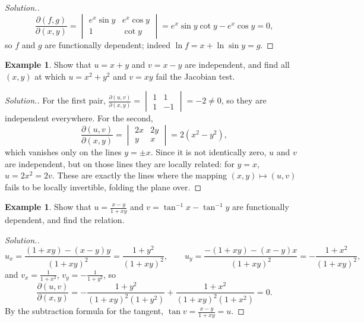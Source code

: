 \documentclass[11pt,a4paper]{article}
\theoremstyle{definition}
\newtheorem{exa}[thm]{Example}
\newenvironment{solution}
  {\renewcommand{\qedsymbol}{}\begin{proof}[\textit{Solution}.]}
  {\end{proof}}
\begin{document}
\begin{solution}
\[\frac{\partial (f,g)}{\partial (x,y)} = \begin{vmatrix}
e^x\sin y & e^x\cos y\\
1 & \cot y
\end{vmatrix} = e^x\sin y\cot y - e^x\cos y = 0 ,\]
so $f$ and $g$ are functionally dependent; indeed $\ln f = x + \ln\sin y = g$.
\end{solution}

\begin{exa}
\label{ex:independent}
Show that $u = x + y$ and $v = x - y$ are independent, and find all $(x,y)$ at
which $u = x^2 + y^2$ and $v = xy$ fail the Jacobian test.
\end{exa}

\begin{solution}
For the first pair, $\frac{\partial(u,v)}{\partial(x,y)} = \begin{vmatrix} 1 & 1\\
1 & -1\end{vmatrix} = -2\neq 0$, so they are independent everywhere. For the
second,
\[\frac{\partial(u,v)}{\partial(x,y)} = \begin{vmatrix} 2x & 2y\\ y &
x\end{vmatrix} = 2(x^2 - y^2),\]
which vanishes only on the lines $y = \pm x$. Since it is not identically zero,
$u$ and $v$ are independent, but on those lines they are locally related: for
$y = x$, $u = 2x^2 = 2v$. These are exactly the lines where the mapping
$(x,y)\mapsto(u,v)$ fails to be locally invertible, folding the plane over.
\end{solution}

\begin{exa}
\label{ex:dependentarctan}
Show that $u = \frac{x - y}{1 + xy}$ and $v = \tan^{-1}x - \tan^{-1}y$ are
functionally dependent, and find the relation.
\end{exa}

\begin{solution}
\[u_x = \frac{(1 + xy) - (x - y)y}{(1 + xy)^2} = \frac{1 + y^2}{(1 + xy)^2},
\qquad u_y = \frac{-(1 + xy) - (x - y)x}{(1 + xy)^2} = -\frac{1 + x^2}{(1 +
xy)^2},\]
and $v_x = \frac{1}{1 + x^2}$, $v_y = -\frac{1}{1 + y^2}$, so
\[\frac{\partial(u,v)}{\partial(x,y)} = -\frac{1 + y^2}{(1 + xy)^2(1 + y^2)} +
\frac{1 + x^2}{(1 + xy)^2(1 + x^2)} = 0 .\]
By the subtraction formula for the tangent, $\tan v = \frac{x - y}{1 + xy} = u$.
\end{solution}
\end{document}
